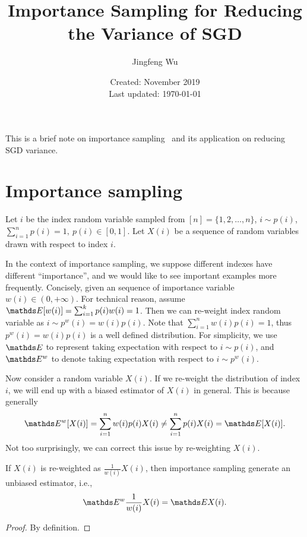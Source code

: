 \documentclass{article}
\title{Importance Sampling for Reducing the Variance of SGD}
\author{Jingfeng Wu}
\date{Created: November 2019\\ Last updated: \today}
\begin{document}
\maketitle

This is a brief note on importance sampling~\cite{alain2015variance,chen2019fast} and its application on reducing SGD variance.

\section{Importance sampling}
Let $i$ be the index random variable sampled from $[n] = \{1,2,\dots,n\}$, $i\sim p(i)$, $\sum_{i=1}^n p(i)=1,\ p(i)\in [0,1]$.
Let $X(i)$ be a sequence of random variables drawn with respect to index $i$. 

In the context of importance sampling, we suppose different indexes have different ``importance'', and we would like to see important examples more frequently. 
Concisely, given an sequence of importance variable $w(i) \in (0,+\infty)$. 
For technical reason, assume $\Ebb [w(i)] = \sum_{i=1}^k p(i) w(i) = 1$.
Then we can re-weight index random variable as $i\sim p^w(i) = w(i)p(i)$.
Note that $\sum_{i=1}^n w(i)p(i) = 1$, thus $p^w(i) = w(i)p(i)$ is a well defined distribution.
For simplicity, we use $\Ebb$ to represent taking expectation with respect to $i\sim p(i)$, and $\Ebb^{w}$ to denote taking expectation with respect to $i\sim p^{w}(i)$.

Now consider a random variable $X(i)$. If we re-weight the distribution of index $i$, we will end up with a biased estimator of $X(i)$ in general. 
This is because generally
\begin{equation}
    \Ebb^w [X(i)] = \sum_{i=1}^n w(i)p(i) X(i) \ne \sum_{i=1}^n p(i) X(i) = \Ebb [X(i)].
\end{equation}
Not too surprisingly, we can correct this issue by re-weighting $X(i)$.
\begin{lem}\label{thm:importance-sampling}
If $X(i)$ is re-weighted as $\frac{1}{w(i)}X(i)$, then importance sampling generate an unbiased estimator, i.e.,
\begin{equation}
    \Ebb^w \frac{1}{w(i)}X(i) = \Ebb X(i).
\end{equation}
\end{lem}
\begin{proof}
By definition.
\end{proof}
\end{document}
